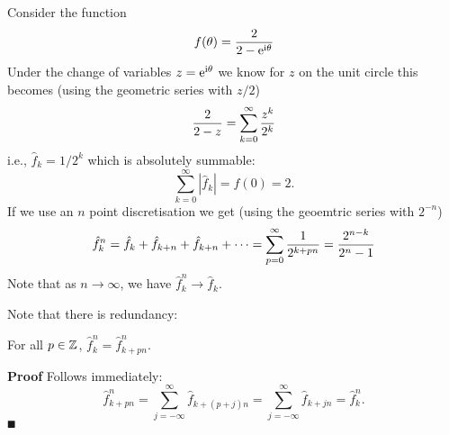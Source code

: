 \begin{example} Consider the function
\[
f(\ensuremath{\theta}) = {2 \over 2 - {\rm e}^{{\rm i} \ensuremath{\theta}}}
\]
Under the change of variables $z = {\rm e}^{{\rm i} \ensuremath{\theta}}$ we know for $z$ on the unit circle this becomes (using the geometric series with $z/2$)
\[
{2 \over 2-z} = \ensuremath{\sum}_{k=0}^\ensuremath{\infty} {z^k \over 2^k}
\]
i.e., $\hat f_k = 1/2^k$ which is absolutely summable:
\[
\ensuremath{\sum}_{k=0}^\ensuremath{\infty} |\hat f_k| = f(0) = 2.
\]
If we use an $n$ point discretisation we get (using the geoemtric series with $2^{-n}$)
\[
\hat f_k^n = \hat f_k + \hat f_{k+n} + \hat f_{k+n} + \ensuremath{\cdots} = \ensuremath{\sum}_{p=0}^\ensuremath{\infty} {1 \over 2^{k+pn}} = {2^{n-k} \over 2^n - 1}
\]
Note that as $n \rightarrow \ensuremath{\infty}$, we have $\hat f_k^n \rightarrow \hat f_k$. \end{example}

Note that there is redundancy:

\begin{corollary}[aliasing] For all $p \in {\mathbb Z}$, $\hat f_k^n = \hat f_{k+pn}^n$.

\end{corollary}
\textbf{Proof} Follows immediately:
\[
\hat f_{k+pn}^n = \sum_{j=-\ensuremath{\infty}}^\ensuremath{\infty} \hat f_{k+(p+j)n}= \sum_{j=-\ensuremath{\infty}}^\ensuremath{\infty} \hat f_{k+j n} = \hat f_k^n.
\]
\ensuremath{\QED}

